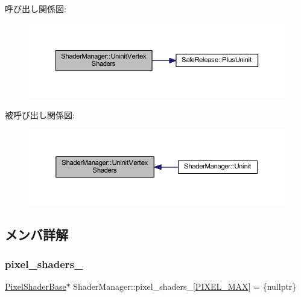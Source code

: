 呼び出し関係図\+:
\nopagebreak
\begin{figure}[H]
\begin{center}
\leavevmode
\includegraphics[width=350pt]{class_shader_manager_af3b8f2931857016315e018041321f35a_cgraph}
\end{center}
\end{figure}
被呼び出し関係図\+:
\nopagebreak
\begin{figure}[H]
\begin{center}
\leavevmode
\includegraphics[width=350pt]{class_shader_manager_af3b8f2931857016315e018041321f35a_icgraph}
\end{center}
\end{figure}


\subsection{メンバ詳解}
\mbox{\label{class_shader_manager_a236d319ea6fb7a9c7233b942fdf4f464}} 
\subsubsection{\texorpdfstring{pixel\+\_\+shaders\+\_\+}{pixel\_shaders\_}}
{\footnotesize\ttfamily \mbox{\hyperlink{class_pixel_shader_base}{Pixel\+Shader\+Base}}$\ast$ Shader\+Manager\+::pixel\+\_\+shaders\+\_\+\mbox{[}\mbox{\hyperlink{class_shader_manager_a7d15d773b3c6a99dd7086c45c8b0be5fa9281ee100f356fae9f9432679705bb9e}{P\+I\+X\+E\+L\+\_\+\+M\+AX}}\mbox{]} = \{nullptr\}\hspace{0.3cm}{\ttfamily [private]}}



